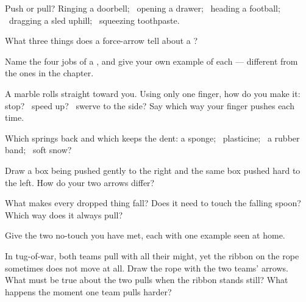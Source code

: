 \begin{exercise}[$\star$]\label{exo:g2:pushes-and-pulls:1}
Push or pull? Ringing a doorbell; \ opening a drawer; \ heading a
football; \ dragging a sled uphill; \ squeezing toothpaste.
\end{exercise}

\begin{exercise}[$\star$]\label{exo:g2:pushes-and-pulls:2}
What three things does a force-arrow tell about a ?
\end{exercise}

\begin{exercise}[$\star$]\label{exo:g2:pushes-and-pulls:3}
Name the four jobs of a , and give your own example of each ---
different from the ones in the chapter.
\end{exercise}

\begin{exercise}[$\star$]\label{exo:g2:pushes-and-pulls:4}
A marble rolls straight toward you. Using only one finger, how do
you make it: stop? \ speed up? \ swerve to the side? Say which way
your finger pushes each time.
\end{exercise}

\begin{exercise}[$\star$]\label{exo:g2:pushes-and-pulls:5}
Which springs back and which keeps the dent: a sponge; \
plasticine; \ a rubber band; \ soft snow?
\end{exercise}

\begin{exercise}[$\star$]\label{exo:g2:pushes-and-pulls:6}
Draw a box being pushed gently to the right and the same box pushed
hard to the left. How do your two arrows differ?
\end{exercise}

\begin{exercise}[$\star$]\label{exo:g2:pushes-and-pulls:7}
What  makes every dropped thing fall? Does it need to touch the
falling spoon? Which way does it always pull?
\end{exercise}

\begin{exercise}[$\star$]\label{exo:g2:pushes-and-pulls:8}
Give the two no-touch  you have met, each with one example
seen at home.
\end{exercise}

\begin{exercise}[$\star\star$]\label{exo:g2:pushes-and-pulls:9}
In tug-of-war, both teams pull with all their might, yet the ribbon
on the rope sometimes does not move at all. Draw the rope with the
two teams' arrows. What must be true about the two pulls when the
ribbon stands still? What happens the moment one team pulls
harder?
\end{exercise}

